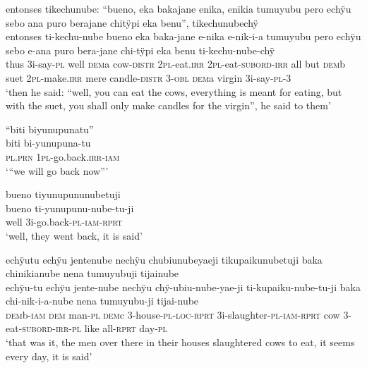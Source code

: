 \ea%
\begingl 
\glpreamble entonses tikechunube: “bueno, eka bakajane enika, enikia tumuyubu pero echÿu sebo ana puro berajane chitÿpi eka benu”, tikechunubechÿ\\
\gla entonses ti-kechu-nube bueno eka baka-jane e-nika e-nik-i-a tumuyubu pero echÿu sebo e-ana puro bera-jane chi-tÿpi eka benu ti-kechu-nube-chÿ\\ 
\glb thus 3i-say-\textsc{pl} well \textsc{dem}a cow-\textsc{distr} 2\textsc{pl}-eat.\textsc{irr} 2\textsc{pl}-eat-\textsc{subord}-\textsc{irr} all but \textsc{dem}b suet 2\textsc{pl}-make.\textsc{irr} mere candle-\textsc{distr} 3-\textsc{obl} \textsc{dem}a virgin 3i-say-\textsc{pl}-3\\ 
\glft ‘then he said: “well, you can eat the cows, everything is meant for eating, but with the suet, you shall only make candles for the virgin”, he said to them’\\ 
\endgl
\xe

\ea%
\begingl 
\glpreamble “biti biyunupunatu”\\
\gla biti bi-yunupuna-tu\\ 
\textsc{pl.prn} 1\textsc{pl}-go.back.\textsc{irr}-\textsc{iam}\\ 
\glft ‘“we will go back now”’\\ 
\endgl
\xe

\ea%
\begingl 
\glpreamble bueno tiyunupununubetuji\\
\gla bueno ti-yunupunu-nube-tu-ji\\ 
\glb well 3i-go.back-\textsc{pl}-\textsc{iam}-\textsc{rprt}\\ 
\glft ‘well, they went back, it is said’\\ 
\endgl
\xe

\ea%
\begingl 
\glpreamble echÿutu echÿu jentenube nechÿu chubiunubeyaeji tikupaikunubetuji baka chinikianube nena tumuyubuji tijainube\\
\gla echÿu-tu echÿu jente-nube nechÿu chÿ-ubiu-nube-yae-ji ti-kupaiku-nube-tu-ji baka chi-nik-i-a-nube nena tumuyubu-ji tijai-nube\\ 
\glb\textsc{dem}b-\textsc{iam} \textsc{dem} man-\textsc{pl} \textsc{dem}c 3-house-\textsc{pl}-\textsc{loc}-\textsc{rprt} 3i-slaughter-\textsc{pl}-\textsc{iam}-\textsc{rprt} cow 3-eat-\textsc{subord}-\textsc{irr}-\textsc{pl} like all-\textsc{rprt} day-\textsc{pl}\\ 
\glft ‘that was it, the men over there in their houses slaughtered cows to eat, it seems every day, it is said’\\ 
\endgl
\xe

